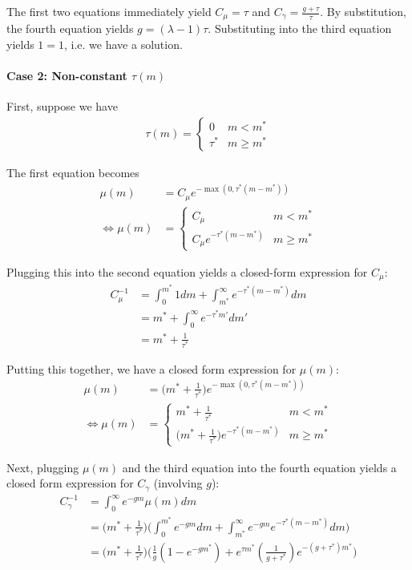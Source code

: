 \documentclass[12pt,english]{article}
\theoremstyle{remark}
\begin{document}
The first two equations immediately yield $C_{\mu} = \tau$ and $C_{\gamma} = \frac{g+\tau}{\tau}$. By substitution, the fourth equation yields $g = (\lambda - 1)\tau$. Substituting into the third equation yields $1 = 1$, i.e. we have a solution.

\paragraph{Case 2: Non-constant $\tau(m)$}

First, suppose we have 
\begin{align*}
	\tau(m) =  \begin{cases} 
	0 & m < m^*  \\
	\tau^* & m \ge m^*
	\end{cases}
\end{align*}

The first equation becomes
\begin{align*}
	\mu(m) &= C_{\mu} e^{-\max(0,\tau^*(m-m^*))} \\
	\Leftrightarrow	\mu(m) &=  \begin{cases} 
	C_{\mu} & m < m^*  \\
	C_{\mu}e^{-\tau^*(m-m^*)} & m \ge m^*
	\end{cases}
\end{align*}

Plugging this into the second equation yields a closed-form expression for $C_{\mu}$: 
\begin{align*}
	C_{\mu}^{-1} &= \int_{0}^{m^*} 1 dm + \int_{m^*}^{\infty} e^{-\tau^*(m-m^*)} dm \\ 
				 &= m^* + \int_{0}^{\infty} e^{-\tau^* m'} dm' \\
				 &= m^* + \frac{1}{\tau^*}
\end{align*}

Putting this together, we have a closed form expression for $\mu(m)$:
\begin{align*}
	\mu(m) &= \Big(m^* + \frac{1}{\tau^*} \Big)e^{-\max(0,\tau^*(m-m^*))} \\
	\Leftrightarrow	\mu(m) &=  \begin{cases} 
	m^* + \frac{1}{\tau^*} & m < m^*  \\
	\Big(m^* + \frac{1}{\tau^*}\Big)e^{-\tau^*(m-m^*)} & m \ge m^*
	\end{cases}	
\end{align*}

Next, plugging $\mu(m)$ and the third equation into the fourth equation yields a closed form expression for $C_{\gamma}$ (involving $g$): 
\begin{align*}
	C_{\gamma}^{-1} &= \int_0^{\infty} e^{-gm} \mu(m) dm \\
				    &= \big(m^* + \frac{1}{\tau^*}\big)\Big(\int_{0}^{m^*} e^{-gm} dm + \int_{m^*}^{\infty} e^{-gm} e^{-\tau^*(m-m^*)}dm \Big) \\
				    &= \big(m^* + \frac{1}{\tau^*}\big)\Big( \frac{1}{g} (1-e^{-gm^*})  + e^{\tau m^*} (\frac{1}{g+\tau^*} )e^{-(g+\tau^*)m^*} \Big) 
\end{align*}
\end{document}
